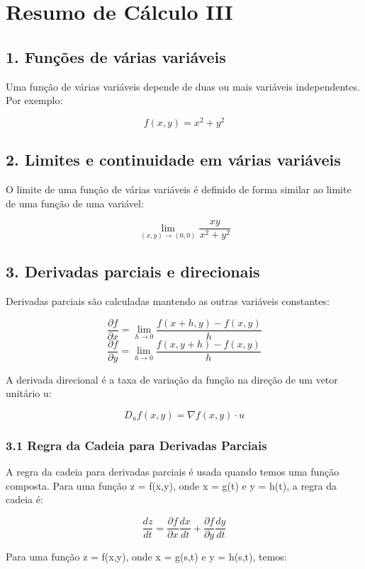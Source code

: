\documentclass{article}
\begin{document}
\section*{Resumo de Cálculo III}

\subsection*{1. Funções de várias variáveis}

Uma função de várias variáveis depende de duas ou mais variáveis independentes. Por exemplo:

$$ f(x,y) = x^2 + y^2 $$

\subsection*{2. Limites e continuidade em várias variáveis}

O limite de uma função de várias variáveis é definido de forma similar ao limite de uma função de uma variável:

$$ \lim_{(x,y) \to (0,0)} \frac{xy}{x^2 + y^2} $$

\subsection*{3. Derivadas parciais e direcionais}

Derivadas parciais são calculadas mantendo as outras variáveis constantes:

$$ \frac{\partial f}{\partial x} = \lim_{h \to 0} \frac{f(x+h,y) - f(x,y)}{h} $$
$$ \frac{\partial f}{\partial y} = \lim_{h \to 0} \frac{f(x,y+h) - f(x,y)}{h} $$

A derivada direcional é a taxa de variação da função na direção de um vetor unitário u:

$$ D_u f(x,y) = \nabla f(x,y) \cdot u $$

\subsubsection*{3.1 Regra da Cadeia para Derivadas Parciais}

A regra da cadeia para derivadas parciais é usada quando temos uma função composta. Para uma função z = f(x,y), onde x = g(t) e y = h(t), a regra da cadeia é:

$$ \frac{dz}{dt} = \frac{\partial f}{\partial x} \frac{dx}{dt} + \frac{\partial f}{\partial y} \frac{dy}{dt} $$

Para uma função z = f(x,y), onde x = g(s,t) e y = h(s,t), temos:
\end{document}
